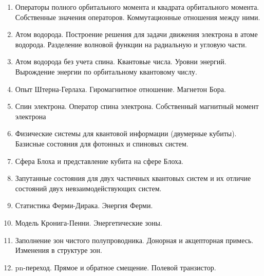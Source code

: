 \documentclass[12pt]{article}
\begin{document}
\begin{enumerate}
электрона.  
    \item Операторы полного орбитального момента и квадрата орбитального момента. Собственные 
значения операторов. Коммутационные отношения между ними.  
    \item Атом водорода. Построение решения для задачи движения электрона в атоме водорода. 
Разделение волновой функции на радиальную и угловую части.  
    \item Атом водорода без учета спина. Квантовые числа. Уровни энергий. Вырождение энергии по 
орбитальному квантовому числу.  
    \item Опыт Штерна-Герлаха. Гиромагнитное отношение. Магнетон Бора. 
    \item Спин электрона. Оператор спина электрона. Собственный магнитный момент электрона 
    \item Физические системы для квантовой информации (двумерные кубиты). Базисные состояния 
для фотонных и спиновых систем.  
    \item Сфера Блоха и представление кубита на сфере Блоха.  
    \item Запутанные состояния для двух частичных квантовых систем и их отличие состояний двух 
невзаимодействующих систем.  
    \item Статистика Ферми-Дирака. Энергия Ферми. 
    \item Модель Кронига-Пенни. Энергетические зоны. 
    \item Заполнение зон чистого полупроводника. Донорная и акцепторная примесь. Изменения в 
структуре зон. 
    \item pn-переход. Прямое и обратное смещение. Полевой транзистор.
\end{enumerate}
\end{document}
